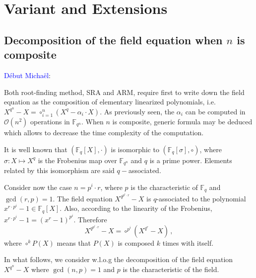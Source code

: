 \documentclass{sig-alternate}
\newcommand{\qq}{q}
\newcommand{\comd}{\noindent \textcolor{blue}{D\'ebut Micha\"el}:}
\begin{document}


\section{Variant and Extensions}


\subsection{Decomposition of the field equation when $n$ is composite}


\comd 



\noindent Both root-finding method, SRA and ARM, require first to write down the field equation as the composition of elementary linearized polynomials, i.e. $X^{q^n}-X=\circ_{i=1}^n (X^q-\alpha_i \cdot X)$.
As previously seen, the $\alpha_i$ can be computed in $\mathcal{O}(n^2)$ operations in $\mathbb{F}_{q^n}$. When $n$ is composite, generic formula may be deduced 
which allows to decrease the time complexity of the computation.

\medskip   

\noindent It is well known that $(\mathbb{F}_q[X],\cdot)$ is isomorphic to  $(\mathbb{F}_q[\sigma], \circ)$, where $\sigma: X \mapsto X^q$ is the Frobenius map over $\mathbb{F}_{q^n}$  and $q$ is a prime power. 
Elements related by this isomorphism are said $q-$associated. 

\medskip

\noindent Consider now the case $n=p^i \cdot r$, where $p$ is the characteristic of $\mathbb{F}_q$ and $\gcd(r,p)=1$.  
The field equation $X^{q^{p^i \cdot r}}-X$ is $q$-associated to the polynomial $x^{r\cdot p^i}-1 \in \mathbb{F}_q[X]$. Also, according
 to the linearity of the Frobenius,  $x^{r \cdot p^i}-1=(x^r-1)^{p^i}$. Therefore 
$$X^{q^{p^i \cdot r}}-X=\circ^{p^i} (X^{q^r}-X)\,,$$
where $\circ^{k} P(X)$ means that $P(X)$ is composed $k$ times with itself. 

\medskip

\noindent In what follows, we consider w.l.o.g the decomposition of the field equation $X^{\qq^n}-X$ where $\gcd(n,p)=1$ and $p$ is the characteristic of the field.

\medskip
\end{document}
